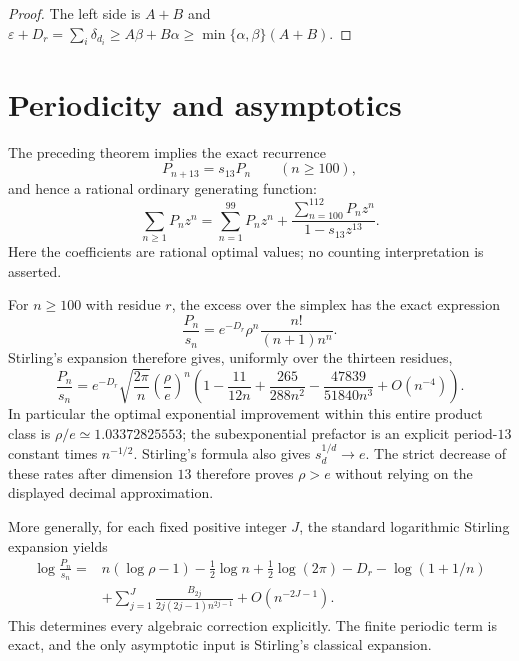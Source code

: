 \begin{proof}
The left side is $A+B$ and
$\varepsilon+D_r=\sum_i\delta_{d_i}
\ge A\beta+B\alpha
\ge\min\{\alpha,\beta\}(A+B)$.
\end{proof}

\section{Periodicity and asymptotics}

The preceding theorem implies the exact recurrence
\begin{equation}\label{eq:proj-rec}
 P_{n+13}=s_{13}P_n\qquad(n\ge100),
\end{equation}
and hence a rational ordinary generating function:
\[
 \sum_{n\ge1}P_n z^n
 =\sum_{n=1}^{99}P_nz^n
   +\frac{\sum_{n=100}^{112}P_nz^n}{1-s_{13}z^{13}}.
\]
Here the coefficients are rational optimal values; no counting
interpretation is asserted.

For $n\ge100$ with residue $r$, the excess over the simplex has the
exact expression
\begin{equation}\label{eq:proj-asymp-exact}
 \frac{P_n}{s_n}
 =e^{-D_r}\rho^n\frac{n!}{(n+1)n^n}.
\end{equation}
Stirling's expansion therefore gives, uniformly over the thirteen
residues,
\begin{equation}\label{eq:proj-asymp}
 \frac{P_n}{s_n}
 =e^{-D_r}\sqrt{\frac{2\pi}{n}}
       \left(\frac\rho e\right)^n
 \left(1-\frac{11}{12n}+\frac{265}{288n^2}
              -\frac{47839}{51840n^3}+O(n^{-4})\right).
\end{equation}
In particular the optimal exponential improvement within this entire
product class is
$\rho/e\simeq1.03372825553$; the subexponential prefactor is an
explicit period-$13$ constant times $n^{-1/2}$.
Stirling's formula also gives $s_d^{1/d}\to e$. The strict decrease
of these rates after dimension $13$ therefore proves $\rho>e$
without relying on the displayed decimal approximation.

More generally, for each fixed positive integer $J$, the standard
logarithmic Stirling expansion \cite{DLMFStirling} yields
\begin{align*}
 \log\frac{P_n}{s_n}
 ={}&n(\log\rho-1)-\frac12\log n
       +\frac12\log(2\pi)-D_r-\log(1+1/n)\\
 &+\sum_{j=1}^{J}
   \frac{B_{2j}}{2j(2j-1)n^{2j-1}}
   +O(n^{-2J-1}).
\end{align*}
This determines every algebraic correction explicitly. The finite
periodic term is exact, and the only asymptotic input is Stirling's
classical expansion.


